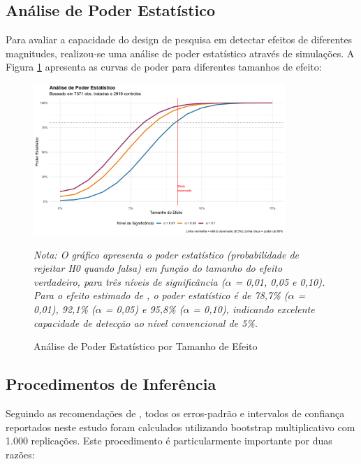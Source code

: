 \documentclass[
	12pt,				%
	oneside,			%
	a4paper,			%
	english,			%
	french,				%
	spanish,			%
	brazil				%
	]{abntex2}
\begin{document}
\subsection{Análise de Poder Estatístico}

Para avaliar a capacidade do design de pesquisa em detectar efeitos de diferentes magnitudes, realizou-se uma análise de poder estatístico através de simulações. A Figura \ref{fig:power} apresenta as curvas de poder para diferentes tamanhos de efeito:

\begin{figure}[htbp]
\centering
\caption{Análise de Poder Estatístico por Tamanho de Efeito}
\label{fig:power}
\includegraphics[width=0.85\textwidth]{../../../data/outputs/additional_figures/power_analysis_simulation.png}

\textit{Nota: O gráfico apresenta o poder estatístico (probabilidade de rejeitar H0 quando falsa) em função do tamanho do efeito verdadeiro, para três níveis de significância ($\alpha$ = 0,01, 0,05 e 0,10). Para o efeito estimado de \mainattpct{}, o poder estatístico é de 78,7\% ($\alpha$ = 0,01), 92,1\% ($\alpha$ = 0,05) e 95,8\% ($\alpha$ = 0,10), indicando excelente capacidade de detecção ao nível convencional de 5\%.}
\end{figure}

\subsection{Procedimentos de Inferência}

Seguindo as recomendações de , todos os erros-padrão e intervalos de confiança reportados neste estudo foram calculados utilizando bootstrap multiplicativo com 1.000 replicações. Este procedimento é particularmente importante por duas razões:
\end{document}
